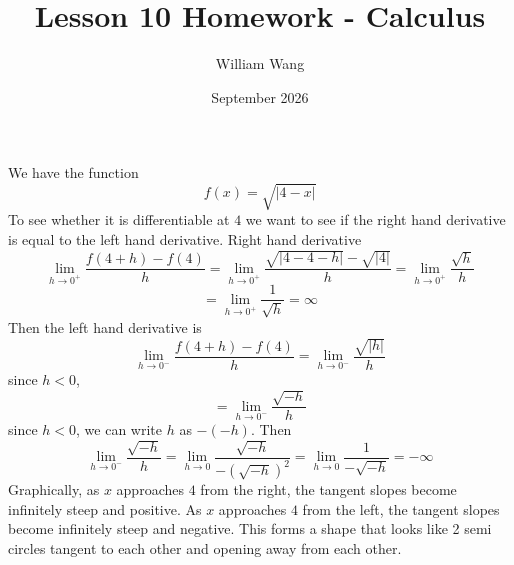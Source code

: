 \documentclass{article}
\title{Lesson 10 Homework - Calculus}
\author{William Wang}
\date{September 2026}
\begin{document}
\maketitle

\section{}
We have the function 
\[f(x) = \sqrt{|4-x|}\]
To see whether it is differentiable at \(4\) we want to see if the right hand derivative is equal to the left hand derivative. Right hand derivative
\[\lim_{h\to 0^+} \frac{f(4+h) - f(4)}{h} = \lim_{h\to 0^+} \frac{\sqrt{|4-4-h|} - \sqrt{|4|}}{h} = \lim_{h\to 0^+}\frac{\sqrt{h}}{h}\]
\[ = \lim_{h\to 0^+} \frac{1}{\sqrt{h}} = \infty\]
Then the left hand derivative is 
\[\lim_{h\to 0^-} \frac{f(4+h) - f(4)}{h} = \lim_{h\to 0^-} \frac{\sqrt{|h|}}{h}\]
since \(h < 0\), 
\[= \lim_{h\to 0^-} \frac{\sqrt{-h}}{h}\]
since \(h < 0\), we can write \(h\) as \(-(-h)\). Then 
\[\lim_{h\to 0^-} \frac{\sqrt{-h}}{h} = \lim_{h\to 0} \frac{\sqrt{-h}}{- (\sqrt{-h})^2} = \lim_{h\to 0} \frac{1}{-\sqrt{-h}} = -\infty\]
Graphically, as $x$ approaches $4$ from the right, the tangent slopes become infinitely steep and positive. As $x$ approaches $4$ from the left, the tangent slopes become infinitely steep and negative. This forms a shape that looks like 2 semi circles tangent to each other and opening away from each other. 
\end{document}
